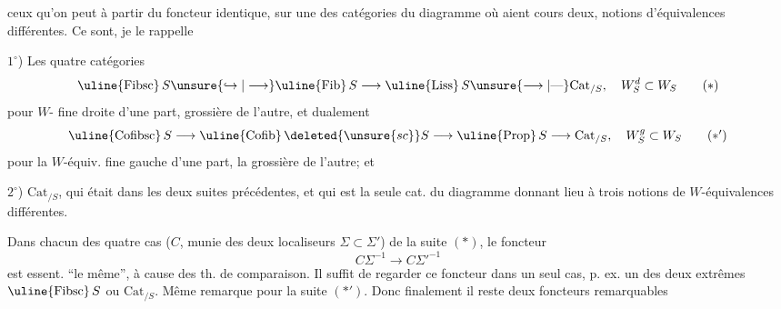 ceux qu'on peut  à partir du foncteur identique, sur une des catégories du diagramme  où aient cours deux,  notions d'équivalences différentes. Ce sont, je le rappelle

$1^\circ$) Les  quatre catégories
\[
 \text{\uline{Fibsc}}\,S\unsure{\hookrightarrow|\longrightarrow}\text{\uline{Fib}}\,S\longrightarrow\text{\uline{Liss}}\,S\unsure{\longrightarrow|\text{---}}\mathrm{Cat}_{/S},\quad W_S^d\subset W_S
 \tag*{$(*)$}
\]
pour   $W$- fine droite d'une part, grossière de l'autre, et dualement
\[
 \text{\uline{Cofibsc}}\,S\longrightarrow\text{\uline{Cofib}}\,\deleted{\unsure{sc}}S\longrightarrow\text{\uline{Prop}}\,S\longrightarrow\mathrm{Cat}_{/S},\quad W_S^g\subset W_S
 \tag*{$(*')$}
\]
pour la $W$-équiv. fine gauche d'une part, la grossière de l'autre\textup{;} et  

$2^\circ$) $\mathrm{Cat}_{/S}$, qui était  dans les deux suites précédentes, et qui est la seule cat. du diagramme donnant lieu à trois notions de $W$-équivalences différentes.

Dans chacun des quatre cas  ($C$, munie des deux localiseurs $\Sigma\subset\Sigma'$) de la suite $(*)$,   le foncteur
\[
 C\Sigma^{-1}\longrightarrow C\Sigma'^{-1}
\]
est essent. ``le même'', à cause des th. de comparaison. Il suffit de regarder ce foncteur dans un seul cas, p. ex. un des deux extrêmes $\text{\uline{Fibsc}}\,S$ ou $\mathrm{Cat}_{/S}$. Même remarque pour la suite $(*')$. Donc finalement il reste deux foncteurs remarquables
